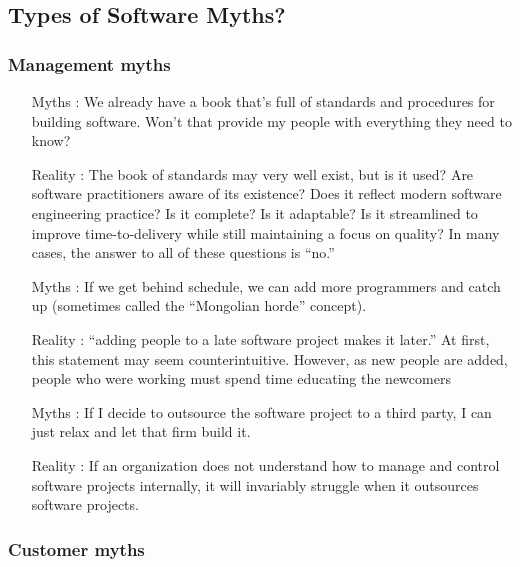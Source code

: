 \documentclass[12pt]{article}
\begin{document}
\newpage

\subsection{Types of Software Myths?}

\subsubsection{Management myths}

\begin{itemize}
	\item [Myths :] We already have a book that’s full of standards and procedures for
building software. Won’t that provide my people with everything they
need to know?
	\item [Reality :] The book of standards may very well exist, but is it used? Are software practitioners aware of its existence? Does it reflect modern
software engineering practice? Is it complete? Is it adaptable? Is it
streamlined to improve time-to-delivery while still maintaining a
focus on quality? In many cases, the answer to all of these questions
is “no.”
\end{itemize}

\begin{itemize}
	\item [Myths :] If we get behind schedule, we can add more programmers and catch up
(sometimes called the “Mongolian horde” concept).
	\item [Reality :] “adding people to a late software project makes it later.” At first, this statement may seem
counterintuitive. However, as new people are added, people who
were working must spend time educating the newcomers
\end{itemize}


\begin{itemize}
	\item [Myths :] If I decide to outsource the software project to a third party, I can just
relax and let that firm build it.
	\item [Reality :] If an organization does not understand how to manage and control
software projects internally, it will invariably struggle when it outsources software projects.
\end{itemize}

\newpage

\subsubsection{Customer myths}
\end{document}
